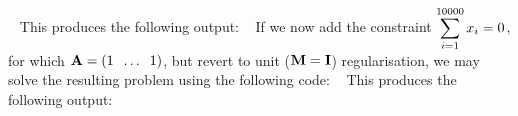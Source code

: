 \documentclass{galahad}
\begin{document}
{\tt \small
\VerbatimInput{\packageexample}
}
\noindent
This produces the following output:
{\tt \small
\VerbatimInput{\packageresults}
}
If we now add the constraint $\displaystyle \sum_{i=1}^{10000} x_i = 0$,
for which ${\mathbf{A}} = ( 1 \;\; \ldots \;\; 1 )$, but revert to unit
(${\mathbf{M}} = {\mathbf{I}}$) regularisation, we may solve the
resulting problem using the following code:
{\tt \small
\VerbatimInput{\packageexampleb}
}
\noindent
This produces the following output:
{\tt \small
\VerbatimInput{\packageresultsb}
}
\end{document}
